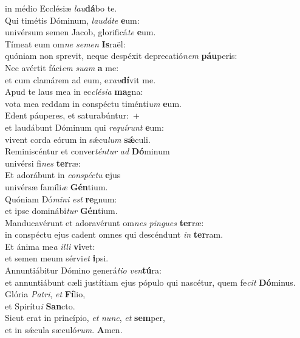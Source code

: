 \oddverse in médio Ecclésiæ \textit{lau}\textbf{dá}bo te.\\
\evenverse Qui timétis Dóminum, \textit{lau}\textit{dá}\textit{te} \textbf{e}um:~\*\\
\evenverse univérsum semen Jacob, glorificá\textit{te} \textbf{e}um.\\
\oddverse Tímeat eum om\textit{ne} \textit{se}\textit{men} \textbf{Is}raël:~\*\\
\oddverse quóniam non sprevit, neque despéxit deprecatió\textit{nem} \textbf{páu}peris:\\
\evenverse Nec avértit fáci\textit{em} \textit{su}\textit{am} \textbf{a} me:~\*\\
\evenverse et cum clamárem ad eum, e\textit{xau}\textbf{dí}vit me.\\
\oddverse Apud te laus mea in ec\textit{clé}\textit{si}\textit{a} \textbf{ma}gna:~\*\\
\oddverse vota mea reddam in conspéctu timénti\textit{um} \textbf{e}um.\\
\evenverse Edent páuperes, et saturabúntur:~+\\
\evenverse  et laudábunt Dóminum qui \textit{re}\textit{quí}\textit{runt} \textbf{e}um:~\*\\
\evenverse vivent corda eórum in sǽcu\textit{lum} \textbf{sǽ}culi.\\
\oddverse Reminiscéntur et conver\textit{tén}\textit{tur} \textit{ad} \textbf{Dó}minum~\*\\
\oddverse univérsi fi\textit{nes} \textbf{ter}ræ:\\
\evenverse Et adorábunt in \textit{con}\textit{spé}\textit{ctu} \textbf{e}jus~\*\\
\evenverse univérsæ famíli\textit{æ} \textbf{Gén}tium.\\
\oddverse Quóniam Dó\textit{mi}\textit{ni} \textit{est} \textbf{re}gnum:~\*\\
\oddverse et ipse dominábi\textit{tur} \textbf{Gén}tium.\\
\evenverse Manducavérunt et adoravérunt om\textit{nes} \textit{pin}\textit{gues} \textbf{ter}ræ:~\*\\
\evenverse in conspéctu ejus cadent omnes qui descéndunt \textit{in} \textbf{ter}ram.\\
\oddverse Et ánima me\textit{a} \textit{il}\textit{li} \textbf{vi}vet:~\*\\
\oddverse et semen meum sérvi\textit{et} \textbf{i}psi.\\
\evenverse Annuntiábitur Dómino generá\textit{ti}\textit{o} \textit{ven}\textbf{tú}ra:~\*\\
\evenverse et annuntiábunt cæli justítiam ejus pópulo qui nascétur, quem fe\textit{cit} \textbf{Dó}minus.\\
\oddverse Glória \textit{Pa}\textit{tri}, \textit{et} \textbf{Fí}lio,~\*\\
\oddverse et Spirítu\textit{i} \textbf{San}cto.\\
\evenverse Sicut erat in princípio, \textit{et} \textit{nunc}, \textit{et} \textbf{sem}per,~\*\\
\evenverse et in sǽcula sæculó\textit{rum}. \textbf{A}men.\\
